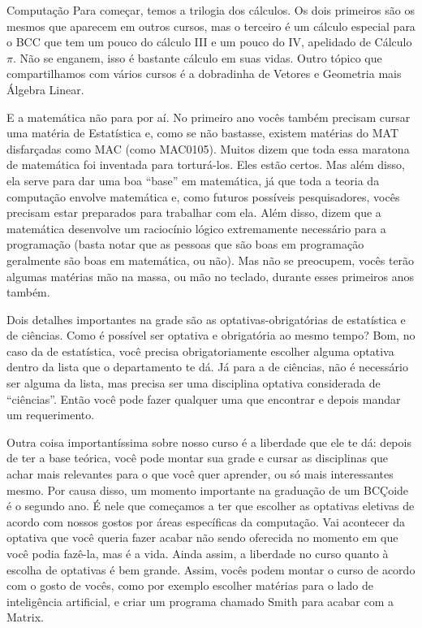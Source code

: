 \begin{subsecao}{Computação}
Para começar, temos a trilogia dos cálculos. Os dois primeiros são os mesmos
que aparecem em outros cursos, mas o terceiro é um cálculo especial para o BCC
que tem um pouco do cálculo III e um pouco do IV, apelidado de Cálculo $\pi$.
Não se enganem, isso é bastante cálculo em suas vidas. Outro tópico que
compartilhamos com vários cursos é a dobradinha de Vetores e Geometria mais
Álgebra Linear. 

E a matemática não para por aí. No primeiro ano vocês também precisam cursar
uma matéria de Estatística e, como se não bastasse, existem matérias do MAT
disfarçadas como MAC (como MAC0105). Muitos dizem que toda essa maratona de
matemática foi inventada para torturá-los. Eles estão certos. Mas além disso,
ela serve para dar uma boa ``base'' em matemática, já que toda a teoria da
computação envolve matemática e, como futuros possíveis pesquisadores, vocês
precisam estar preparados para trabalhar com ela. Além disso, dizem que a
matemática desenvolve um raciocínio lógico extremamente necessário para a
programação (basta notar que as pessoas que são boas em programação geralmente
são boas em matemática, ou não). Mas não se preocupem, vocês terão algumas
matérias mão na massa, ou mão no teclado, durante esses primeiros anos também.

Dois detalhes importantes na grade são as optativas-obrigatórias de
estatística e de ciências. Como é possível ser optativa e obrigatória ao mesmo
tempo? Bom, no caso da de estatística, você precisa obrigatoriamente escolher
alguma optativa dentro da lista que o departamento te dá. Já para a de
ciências, não é necessário ser alguma da lista, mas precisa ser uma disciplina
optativa considerada de ``ciências''. Então você pode fazer qualquer uma que
encontrar e depois mandar um requerimento.

Outra coisa importantíssima sobre nosso curso é a liberdade que ele te dá:
depois de ter a base teórica, você pode montar sua grade e cursar as
disciplinas que achar mais relevantes para o que você quer aprender, ou só
mais interessantes mesmo. Por causa disso, um momento importante na graduação
de um BCÇoide é o segundo ano. É nele que começamos a ter que escolher as
optativas eletivas de acordo com nossos gostos por áreas específicas da
computação. Vai acontecer da optativa que você queria fazer acabar não sendo
oferecida no momento em que você podia fazê-la, mas é a vida. Ainda assim, a
liberdade no curso quanto à escolha de optativas é bem grande. Assim, vocês
podem montar o curso de acordo com o gosto de vocês, como por exemplo escolher
matérias para o lado de inteligência artificial, e criar um programa chamado
Smith para acabar com a Matrix.


\end{subsecao}

